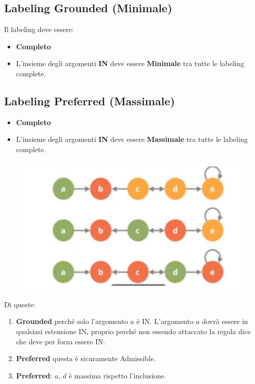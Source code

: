 \subsection{Labeling Grounded (Minimale)}
Il labeling deve essere:
\begin{itemize}
    \item \textbf{Completo}
    \item L'insieme degli argomenti \textbf{IN} deve essere
          \textbf{Minimale} tra tutte le labeling complete.
\end{itemize}
\subsection{Labeling Preferred (Massimale)}
\begin{itemize}
    \item \textbf{Completo}
    \item L'insieme degli argomenti \textbf{IN} deve essere
          \textbf{Massimale} tra tutte le labeling complete.
\end{itemize}
\begin{figure}[H]
    \centering
    \includegraphics[width=12cm, keepaspectratio]{img/Cap7/GR.png}
\end{figure}
Di queste:
\begin{enumerate}
    \item \textbf{Grounded} perché solo l'argomento $a$ è IN. L'argomento
          $a$ dovrà essere in qualsiasi estensione IN, proprio perché non essendo
          attaccato la regola dice che deve per forza essere IN.
    \item \textbf{Preferred} questa è sicuramente Admissible.
    \item \textbf{Preferred}: $a$, $d$ è massima rispetto l'inclusione.
\end{enumerate}

